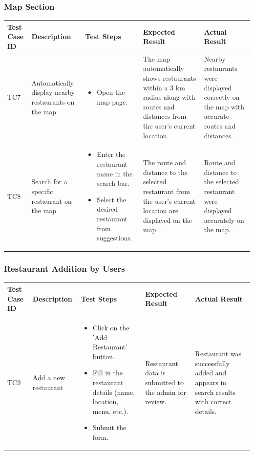 \documentclass[12pt, a4paper, oneside]{article}
\begin{document}
\subsubsection{Map Section}
\captionsetup{type=table}
\begin{tabularx}{\textwidth}{|X|X|X|X|X|}
	\hline
	\rowcolor{gray}
	\textbf{Test Case ID} & \textbf{Description} & \textbf{Test Steps} & \textbf{Expected Result} & \textbf{Actual Result} \\ \hline
	TC7 & Automatically display nearby restaurants on the map & 
    \begin{itemize}[left=0pt, nosep]
        \item Open the map page.
    \end{itemize}
    & The map automatically shows restaurants within a 3 km radius along with routes and distances from the user's current location. & Nearby restaurants were displayed correctly on the map with accurate routes and distances. \\ \hline
	TC8 & Search for a specific restaurant on the map & 
    \begin{itemize}[left=0pt, nosep]
        \item Enter the restaurant name in the search bar.
        \item Select the desired restaurant from suggestions.
    \end{itemize}
    & The route and distance to the selected restaurant from the user's current location are displayed on the map. & Route and distance to the selected restaurant were displayed accurately on the map. \\ \hline
\end{tabularx}
\label{tab:map-section}

\subsubsection{Restaurant Addition by Users}
\captionsetup{type=table}
\begin{tabularx}{\textwidth}{|X|X|X|X|X|}
	\hline
	\rowcolor{gray}
	\textbf{Test Case ID} & \textbf{Description} & \textbf{Test Steps} & \textbf{Expected Result} & \textbf{Actual Result} \\ \hline
	TC9 & Add a new restaurant & 
    \begin{itemize}[left=0pt, nosep]
        \item Click on the 'Add Restaurant' button.
        \item Fill in the restaurant details (name, location, menu, etc.).
        \item Submit the form.
    \end{itemize}
    & Restaurant data is submitted to the admin for review. & Restaurant was successfully added and appears in search results with correct details. \\ \hline
\end{tabularx}
\label{tab:restaurant-addition}
\end{document}
